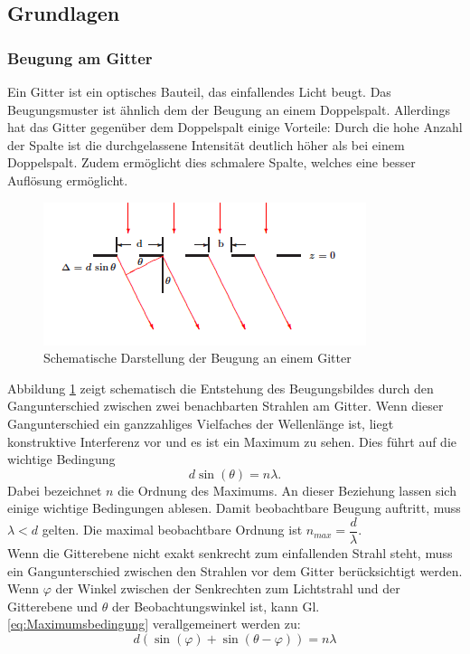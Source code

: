 \documentclass[12pt,a4paper]{article}
\begin{document}
	\subsection{Grundlagen}
	\subsubsection{Beugung am Gitter}
	Ein Gitter ist ein optisches Bauteil, das einfallendes Licht beugt. Das Beugungsmuster ist ähnlich dem der Beugung an einem Doppelspalt. Allerdings hat das Gitter gegenüber dem Doppelspalt einige Vorteile: Durch die hohe Anzahl der Spalte ist die durchgelassene Intensität deutlich höher als bei einem Doppelspalt. Zudem ermöglicht dies schmalere Spalte, welches eine besser Auflösung ermöglicht.\\
	\begin{figure}
		\begin{center}
			\includegraphics[scale=1.2]{Bilder/Gitterbeugung_Schema.PNG}
		\end{center}
		\caption[Gitterbeugung Schema]{Schematische Darstellung der Beugung an einem Gitter}
		\label{fig:Gitterbeugung_Schema}
	\end{figure}
	Abbildung \ref{fig:Gitterbeugung_Schema} zeigt schematisch die Entstehung des Beugungsbildes durch den Gangunterschied zwischen zwei benachbarten Strahlen am Gitter. Wenn dieser Gangunterschied ein ganzzahliges Vielfaches der Wellenlänge ist, liegt konstruktive Interferenz vor und es ist ein Maximum zu sehen. Dies führt auf die wichtige Bedingung
	\begin{equation}
	d \sin (\theta) = n \lambda.
	\label{eq:Maximumsbedingung}
	\end{equation}
	Dabei bezeichnet $n$ die Ordnung des Maximums. An dieser Beziehung lassen sich einige wichtige Bedingungen ablesen. Damit beobachtbare Beugung auftritt, muss $\lambda < d$ gelten. Die maximal beobachtbare Ordnung ist $n_{max} = \dfrac{d}{\lambda}$. \\
	Wenn die Gitterebene nicht exakt senkrecht zum einfallenden Strahl steht, muss ein Gangunterschied zwischen den Strahlen vor dem Gitter berücksichtigt werden. Wenn $\varphi$ der Winkel zwischen der Senkrechten zum Lichtstrahl und der Gitterebene und $\theta$ der Beobachtungswinkel ist, kann Gl. \ref{eq:Maximumsbedingung} verallgemeinert werden zu:
	\begin{equation}
	d(\sin(\varphi) + \sin(\theta - \varphi)) = n \lambda
	\label{eq:VerallgemeinerteMaximumsbedingung}
	\end{equation}
	
\end{document}
